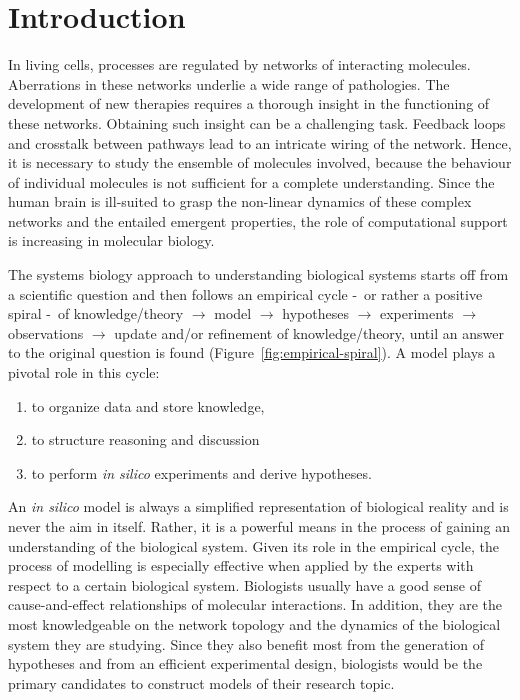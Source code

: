 \documentclass{bmcart}
\begin{document}
\section*{Introduction}\label{sec:introduction}
In living cells, processes are regulated by networks of interacting molecules.
Aberrations in these networks underlie a wide range of pathologies. The development of new therapies
requires a thorough insight in the functioning of these networks. Obtaining such insight can be a challenging task.
Feedback loops and crosstalk between pathways lead to an intricate wiring of the network.
Hence, it is necessary to study the ensemble of molecules involved, because the 
behaviour of individual molecules is not sufficient for a complete understanding. 
Since the human brain is ill-suited to grasp the non-linear dynamics of these complex networks and
the entailed emergent properties, the role of computational support is increasing
in molecular biology.



The systems biology approach to understanding biological systems starts off from a
scientific question and then follows an empirical cycle \--\ or rather a positive spiral \--\ of
knowledge/theory $\rightarrow$ model $\rightarrow$ hypotheses $\rightarrow$ experiments $\rightarrow$
observations $\rightarrow$ update and/or refinement of knowledge/theory,
until an answer to the original question is found (Figure~\ref{fig:empirical-spiral}).
A model plays a pivotal role in this cycle:
\begin{enumerate}
  \item to organize data and store knowledge,
  \item to structure reasoning and discussion
  \item to perform \emph{in silico} experiments and derive hypotheses.
\end{enumerate}
An \emph{in silico} model is always a simplified representation of biological reality and is never the 
aim in itself.
Rather, it is a powerful means in the process of gaining an understanding of the biological system.
Given its role in the empirical cycle, the process of modelling is especially effective
when applied by the experts with respect to a certain biological system. Biologists usually have a good sense 
of cause-and-effect relationships of molecular interactions. In addition, they are the most knowledgeable
on the network topology and the dynamics of the biological system they are studying.
Since they also benefit most from the generation of hypotheses and from an efficient experimental design, 
biologists would be the primary candidates to construct models of their research topic.
\end{document}
